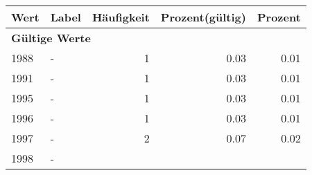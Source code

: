      \begin{longtable}{lXrrr}
     \toprule
     \textbf{Wert} & \textbf{Label} & \textbf{Häufigkeit} & \textbf{Prozent(gültig)} & \textbf{Prozent} \\
     \endhead
     \midrule
     \multicolumn{5}{l}{\textbf{Gültige Werte}}\\

     1988 &
     \multicolumn{1}{X}{ -  } &


       \num{1} &
       \num[round-mode=places,round-precision=2]{0,03} &
         \num[round-mode=places,round-precision=2]{0,01} \\

     1991 &
     \multicolumn{1}{X}{ -  } &


       \num{1} &
       \num[round-mode=places,round-precision=2]{0,03} &
         \num[round-mode=places,round-precision=2]{0,01} \\

     1995 &
     \multicolumn{1}{X}{ -  } &


       \num{1} &
       \num[round-mode=places,round-precision=2]{0,03} &
         \num[round-mode=places,round-precision=2]{0,01} \\

     1996 &
     \multicolumn{1}{X}{ -  } &


       \num{1} &
       \num[round-mode=places,round-precision=2]{0,03} &
         \num[round-mode=places,round-precision=2]{0,01} \\

     1997 &
     \multicolumn{1}{X}{ -  } &


       \num{2} &
       \num[round-mode=places,round-precision=2]{0,07} &
         \num[round-mode=places,round-precision=2]{0,02} \\

     1998 &
     \multicolumn{1}{X}{ -  } &



\end{longtable}
